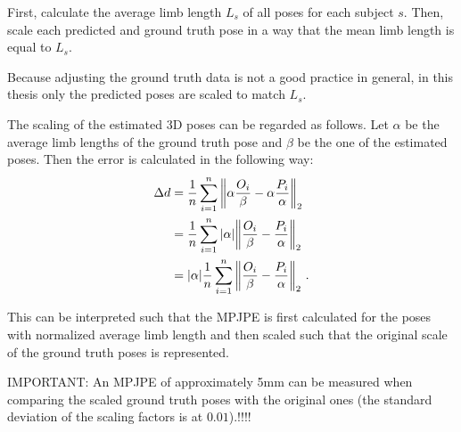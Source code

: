 First, calculate the average limb length $L_s$ of all poses for each subject $s$.
Then, scale each predicted and ground truth pose in a way that the mean limb length is equal to $L_s$.

Because adjusting the ground truth data is not a good practice in general, in this thesis only the predicted poses are scaled to match $L_s$.

The scaling of the estimated 3D poses can be regarded as follows. Let $\alpha$ be the average limb lengths of the ground truth pose and $\beta$ be the one of the estimated poses.
Then the error is calculated in the following way:
\begin{align}
	\Delta d &= \frac{1}{n} \sum_{i = 1}^{n}  \norm{\alpha \frac{O_i}{\beta} - \alpha \frac{P_i}{\alpha}}_2 \\
	&=  \frac{1}{n} \sum_{i = 1}^{n} \abs{\alpha} \norm{\frac{O_i}{\beta} -\frac{P_i}{\alpha}}_2 \\
	&=  \abs{\alpha} \frac{1}{n} \sum_{i = 1}^{n} \norm{\frac{O_i}{\beta} -\frac{P_i}{\alpha}}_2 \ .
	\label{eq:protocol2-mpjpe-scaling}
\end{align}

This can be interpreted such that the MPJPE is first calculated for the poses with normalized average limb length and then scaled such that the original scale of the ground truth poses is represented. 

IMPORTANT: An MPJPE of approximately 5mm can be measured when comparing the scaled ground truth poses with the original ones (the standard deviation of the scaling factors is at $0.01$).!!!!

